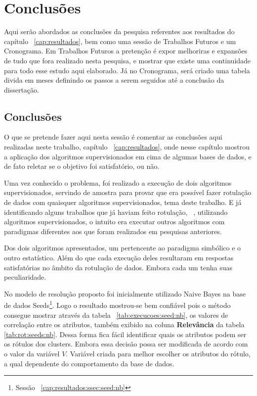 \chapter*{Conclusões}\label{cap:conclusao}
Aqui serão abordados as conclusões da pesquisa referentes aos resultados do capítulo ~\ref{cap:resultados},  bem como uma sessão de Trabalhos Futuros e um Cronograma. Em Trabalhos Futuros a pretenção é expor melhoriras e expansões de tudo que fora realizado  nesta pesquisa, e mostrar que existe uma continuidade para todo esse estudo aqui elaborado. Já no Cronograma, será criado uma tabela divida em meses definindo os passos a serem seguidos até a conclusão da dissertação.

\section*{Conclusões}

O que se pretende fazer aqui nesta sessão é comentar as conclusões aqui realizadas neste trabalho, capítulo ~\ref{cap:resultados}, onde nesse capítulo mostrou a aplicação dos algoritmos supervisionados em cima de algumas bases de dados, e de fato reletar se o objetivo foi satisfatório, ou não.

Uma vez conhecido o problema, foi realizado a execução de dois algoritmos supervisionados, servindo de amostra para provar que era possível fazer rotulação de dados com quaisquer algoritmos supervisionados, tema deste trabalho. E já identificando alguns trabalhos que já haviam feito rotulação, ~\cite{Lopes}, utilizando algoritmos supervisionados, o intuito era executar outros algoritmos com paradigmas diferentes aos que foram realizados em pesquisas anteriores. 

Dos dois algoritmos apresentados, um pertencente ao paradigma simbólico e o outro estatístico. Além do que cada execução deles resultaram em respostas satisfatórias no âmbito da rotulação de dados. Embora cada um tenha suas peculiaridade.

No modelo de resolução proposto foi inicialmente utilizado Naive Bayes na base de dados Seeds\footnote{Sessão ~\ref{cap:resultados:ssec:seed:nb}}. Logo o resultado mostrou-se bem confiável pois o método consegue mostrar através da tabela ~\ref{tab:execucoes:seed:nb}, os valores de correlação entre os atributos, também exibido na coluna \textbf{Relevância} da tabela \ref{tab:rot:seeds:nb}. Dessa forma fica fácil identificar quais os atributos podem ser os rótulos dos clusters. Embora essa decisão possa ser modificada de acordo com o valor da variável ${V}$. Variável criada para melhor escolher os atributos do rótulo, a qual dependente do comportamento da base de dados.

